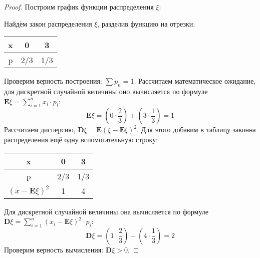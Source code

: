 \begin{proof}
	Построим график функции распределения $\xi$:
	\begin{center}
	\end{center}
	Найдём закон распределения $\xi$, разделив функцию на отрезки:
	\begin{center}
		\begin{tabular}{|c||c|c|}
			\hline
			x & 0 & 3 \\
			\hline
			p & 2/3 & 1/3 \\
			\hline
		\end{tabular}
	\end{center}
	Проверим верность построения: $\sum p_n = 1$.
	\newline
	Рассчитаем математическое ожидание, для дискретной случайной величины оно вычисляется по формуле $\textbf{E}\xi = \sum_{i = 1}^{n} x_i \cdot p_i$:
	\[
		\textbf{E}\xi = (0 \cdot \frac{2}{3}) + (3 \cdot \frac{1}{3}) = 1
	\]
	Рассчитаем дисперсию, $\textbf{D}\xi = \textbf{E}(\xi - \textbf{E}\xi)^2$. Для этого добавим в таблицу законна распределения ещё одну вспомогательную строку:
	\begin{center}
		\begin{tabular}{|c||c|c|}
			\hline
			x & 0 & 3 \\
			\hline
			p & 2/3 & 1/3 \\
			\hline
			$(x - \textbf{E}\xi)^2$ & 1 & 4 \\
			\hline
		\end{tabular}
	\end{center}
	Для дискретной случайной величины она вычисляется по формуле $\textbf{D}\xi = \sum_{i = 1}^{n} (x_i - \textbf{E}\xi)^2 \cdot p_i$:
	\[
		\textbf{D}\xi = (1 \cdot \frac{2}{3}) + (4 \cdot \frac{1}{3}) = 2
	\]
	Проверим верность вычисления: $\textbf{D}\xi > 0$.
	\newline

\end{proof}
